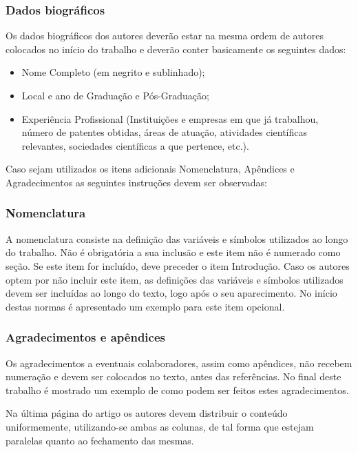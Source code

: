 \documentclass[portugues]{sobraep}
\begin{document}
\subsubsection{Dados biográficos}
Os dados biográficos dos autores deverão estar na mesma ordem de autores colocados no início do trabalho e deverão conter basicamente os seguintes dados:
\begin{itemize}
	\item Nome Completo (em negrito e sublinhado);
	\item Local e ano de Graduação e Pós-Graduação;
	\item Experiência Profissional (Instituições e empresas em que já trabalhou, número de patentes obtidas, áreas de atuação, atividades científicas relevantes, sociedades científicas a que pertence, etc.). \newline
\end{itemize}

Caso sejam utilizados os itens adicionais Nomenclatura, Apêndices e Agradecimentos as seguintes instruções devem ser observadas:

\subsubsection{Nomenclatura}
A nomenclatura consiste na definição das variáveis e símbolos utilizados ao longo do trabalho. Não é obrigatória a sua inclusão e este item não é numerado como seção. Se este item for incluído, deve preceder o item Introdução. Caso os autores optem por não incluir este item, as definições das variáveis e símbolos utilizados devem ser incluídas ao longo do texto, logo após o seu aparecimento. No início destas normas é apresentado um exemplo para este item opcional.

\vspace*{-0.1mm}
\subsubsection{Agradecimentos e apêndices}
Os agradecimentos a eventuais colaboradores, assim como apêndices, não recebem numeração e devem ser colocados no texto, antes das referências.  No final deste trabalho  é mostrado um exemplo de como podem ser feitos estes agradecimentos.

Na última página do artigo os autores devem distribuir o conteúdo uniformemente, utilizando-se ambas as colunas, de tal forma que estejam paralelas quanto ao fechamento das mesmas.
\end{document}
